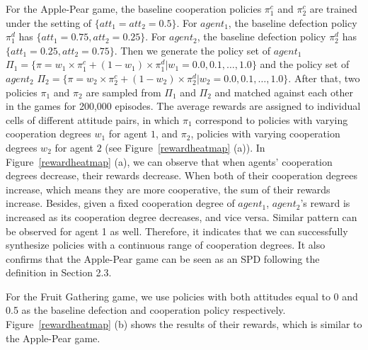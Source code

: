 \documentclass{article}
\begin{document}
For the Apple-Pear game, the baseline cooperation policies $\pi_1^c$ and $\pi_2^c$ are trained under the setting of $\{att_1 = att_2 = 0.5\}$. For $agent_1$, the baseline defection policy $\pi_1^d$ has $\{att_1 = 0.75, att_2 = 0.25\}$. For $agent_2$, the baseline defection policy $\pi_2^d$ has $\{att_1 = 0.25, att_2 = 0.75\}$. Then we generate the policy set of $agent_1$ $\Pi_1 = \{\pi = w_1 \times \pi_1^c + (1 - w_1) \times \pi_1^d | w_1 = 0.0, 0.1, \ldots, 1.0\}$ and the policy set of $agent_2$ $\Pi_2 = \{\pi = w_2 \times \pi_2^c + (1 - w_2) \times \pi_2^d | w_2 = 0.0, 0.1, \ldots, 1.0\}$. After that, two policies $\pi_1$ and $\pi_2$ are sampled from $\Pi_1$ and $\Pi_2$ and matched against each other in the games for 200,000 episodes. The average rewards are assigned to individual cells of different attitude pairs, in which $\pi_1$ correspond to policies with varying cooperation degrees $w_1$ for agent $1$, and $\pi_2$, policies with varying cooperation degrees $w_2$ for agent $2$ (see Figure~\ref{rewardheatmap} (a)). In Figure~\ref{rewardheatmap} (a), we can observe that when agents' cooperation degrees decrease, their rewards decrease. When both of their cooperation degrees increase, which means they are more cooperative, the sum of their rewards increase. Besides, given a fixed cooperation degree of $agent_1$, $agent_2$'s reward is increased as its cooperation degree decreases, and vice versa. Similar pattern can be observed for agent 1 as well. Therefore, it indicates that we can successfully synthesize policies with a continuous range of cooperation degrees. It also confirms that the Apple-Pear game can be seen as an SPD following the definition in Section 2.3.

For the Fruit Gathering game, we use policies with both attitudes equal to 0 and 0.5 as the baseline defection and cooperation policy respectively. Figure~\ref{rewardheatmap} (b) shows the results of their rewards, which is similar to the Apple-Pear game.
\end{document}

